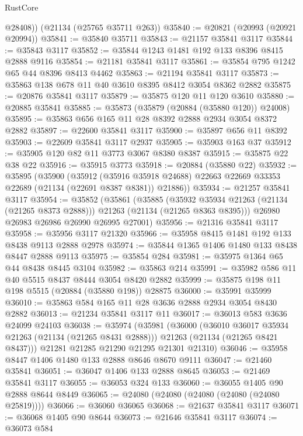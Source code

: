 \begin{lexlean}{RustCore}
\begin{coremodule}
        @28408))
    (@21134 (@25765 @35711 @263))
@35840 := @20821 (@20993 (@20921 @20994))
@35841 := @35840 @35711
@35843 := @21157 @35841 @3117
@35844 := @35843 @3117
@35852 := @35844 @1243 @1481 @192 @133 @8396 @8415 @2888 @9116
@35854 := @21181 @35841 @3117
@35861 := @35854 @795 @1242 @65 @44 @8396 @8413 @4462
@35863 := @21194 @35841 @3117
@35873 := @35863 @138 @678 @11 @40 @3610 @8395 @8412 @3054 @8362 @2882
@35875 := @20876 @35841 @3117
@35879 := @35875 @120 @11 @120 @3610
@35880 := @20885 @35841
@35885 := @35873 (@35879 (@20884 (@35880 @120)) @24008)
@35895 := @35863 @656 @165 @11 @28 @8392 @2888 @2934 @3054 @8372 @2882
@35897 := @22600 @35841 @3117
@35900 := @35897 @656 @11 @8392
@35903 := @22609 @35841 @3117 @2937
@35905 := @35903 @163 @37
@35912 := @35905 @120 @82 @11 @3773 @3067 @8380 @8387
@35915 := @35875 @22 @38 @22
@35916 := @35915 @3773
@35918 := @20884 (@35880 @22)
@35932 := @35895
    (@35900
      (@35912
        (@35916 @35918 @24688)
        @22663
        @22669
        @33353
        @22689
        (@21134 (@22691 @8387 @8381))
        @21886))
@35934 := @21257 @35841 @3117
@35954 := @35852
    (@35861
      (@35885
        (@35932 @35934 @21263 (@21134 (@21265 @8373 @2888)))
        @21263
        (@21134 (@21265 @8363 @8395)))
      @26980
      @26983
      @26986
      @26990
      @26995
      @27001)
@35956 := @21316 @35841 @3117
@35958 := @35956 @3117 @21320
@35966 := @35958 @8415 @1481 @192 @133 @8438 @9113 @2888 @2978
@35974 := @35844 @1365 @1406 @1480 @133 @8438 @8447 @2888 @9113
@35975 := @35854 @284
@35981 := @35975 @1364 @65 @44 @8438 @8445 @3104
@35982 := @35863 @214
@35991 := @35982 @586 @11 @40 @5515 @8437 @8444 @3054 @8420 @2882
@35999 := @35875 @198 @11 @198 @5515 (@20884 (@35880 @198)) @28875
@36000 := @35991 @35999
@36010 := @35863 @584 @165 @11 @28 @3636 @2888 @2934 @3054 @8430 @2882
@36013 := @21234 @35841 @3117 @11
@36017 := @36013 @583 @3636 @24099 @24103
@36038 := @35974
    (@35981
      (@36000
        (@36010 @36017 @35934 @21263 (@21134 (@21265 @8431 @2888)))
        @21263
        (@21134 (@21265 @8421 @8437)))
      @21281
      @21285
      @21290
      @21295
      @21301
      @21310)
@36046 := @35958 @8447 @1406 @1480 @133 @2888 @8646 @8670 @9111
@36047 := @21460 @35841
@36051 := @36047 @1406 @133 @2888 @8645
@36053 := @21469 @35841 @3117
@36055 := @36053 @324 @133
@36060 := @36055 @1405 @90 @2888 @8644 @8449
@36065 := @24080 (@24080 (@24080 (@24080 (@24080 @25819))))
@36066 := @36060 @36065
@36068 := @21637 @35841 @3117
@36071 := @36068 @1405 @90 @8644
@36073 := @21646 @35841 @3117
@36074 := @36073 @584

\end{coremodule}
\end{lexlean}
